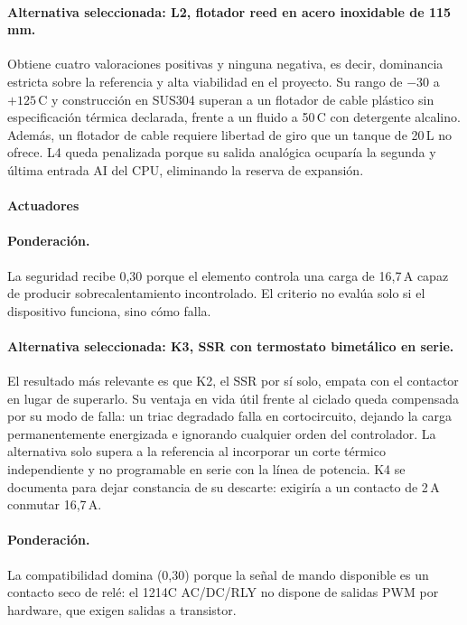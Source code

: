 \paragraph{Alternativa seleccionada: L2, flotador reed en acero inoxidable de 115\,mm.} Obtiene cuatro valoraciones positivas y ninguna negativa, es decir, dominancia estricta sobre la referencia y alta viabilidad en el proyecto. Su rango de $-30$ a $+125$\,\textdegree C y construcción en SUS304 superan a un flotador de cable plástico sin especificación térmica declarada, frente a un fluido a 50\,\textdegree C con detergente alcalino. Además, un flotador de cable requiere libertad de giro que un tanque de 20\,L no ofrece. L4 queda penalizada porque su salida analógica ocuparía la segunda y última entrada AI del CPU, eliminando la reserva de expansión.

\paragraph{Actuadores}



\paragraph{Ponderación.} La seguridad recibe 0,30 porque el elemento controla una carga de 16,7\,A capaz de producir sobrecalentamiento incontrolado. El criterio no evalúa solo si el dispositivo funciona, sino cómo falla.

\paragraph{Alternativa seleccionada: K3, SSR con termostato bimetálico en serie.} El resultado más relevante es que K2, el SSR por sí solo, empata con el contactor en lugar de superarlo. Su ventaja en vida útil frente al ciclado queda compensada por su modo de falla: un triac degradado falla en cortocircuito, dejando la carga permanentemente energizada e ignorando cualquier orden del controlador. La alternativa solo supera a la referencia al incorporar un corte térmico independiente y no programable en serie con la línea de potencia. K4 se documenta para dejar constancia de su descarte: exigiría a un contacto de 2\,A conmutar 16,7\,A.



\paragraph{Ponderación.} La compatibilidad domina (0,30) porque la señal de mando disponible es un contacto seco de relé: el 1214C AC/DC/RLY no dispone de salidas PWM por hardware, que exigen salidas a transistor.

